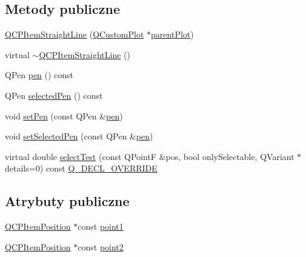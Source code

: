 \subsection*{Metody publiczne}
\begin{DoxyCompactItemize}
\item 
\hyperlink{class_q_c_p_item_straight_line_a41fd2e1f006983449eca9830930c3b10}{Q\+C\+P\+Item\+Straight\+Line} (\hyperlink{class_q_custom_plot}{Q\+Custom\+Plot} $\ast$\hyperlink{class_q_c_p_layerable_ab7e0e94461566093d36ffc0f5312b109}{parent\+Plot})
\item 
virtual \hyperlink{class_q_c_p_item_straight_line_a1f0730759916ce203baeaad1ad2af3ea}{$\sim$\+Q\+C\+P\+Item\+Straight\+Line} ()
\item 
Q\+Pen \hyperlink{class_q_c_p_item_straight_line_ad858ab1a444391aab778f765453ea222}{pen} () const 
\item 
Q\+Pen \hyperlink{class_q_c_p_item_straight_line_a9e33ae966a7e2ea1083b3b9aeabeaea5}{selected\+Pen} () const 
\item 
void \hyperlink{class_q_c_p_item_straight_line_a9f36c9c9e60d7d9ac084c80380ac8601}{set\+Pen} (const Q\+Pen \&\hyperlink{class_q_c_p_item_straight_line_ad858ab1a444391aab778f765453ea222}{pen})
\item 
void \hyperlink{class_q_c_p_item_straight_line_a5c33559498d33543fa95cf0a36e851ff}{set\+Selected\+Pen} (const Q\+Pen \&\hyperlink{class_q_c_p_item_straight_line_ad858ab1a444391aab778f765453ea222}{pen})
\item 
virtual double \hyperlink{class_q_c_p_item_straight_line_a2e36c9d4dcc3aeda78a5584f790e39e3}{select\+Test} (const Q\+PointF \&pos, bool only\+Selectable, Q\+Variant $\ast$details=0) const \hyperlink{qcustomplot_8hh_a42cc5eaeb25b85f8b52d2a4b94c56f55}{Q\+\_\+\+D\+E\+C\+L\+\_\+\+O\+V\+E\+R\+R\+I\+DE}
\end{DoxyCompactItemize}
\subsection*{Atrybuty publiczne}
\begin{DoxyCompactItemize}
\item 
\hyperlink{class_q_c_p_item_position}{Q\+C\+P\+Item\+Position} $\ast$const \hyperlink{class_q_c_p_item_straight_line_ac131a6ffe456f2cc7364dce541fe0120}{point1}
\item 
\hyperlink{class_q_c_p_item_position}{Q\+C\+P\+Item\+Position} $\ast$const \hyperlink{class_q_c_p_item_straight_line_ad26c0a732e471f63f75d481dcd48cfc9}{point2}
\end{DoxyCompactItemize}
